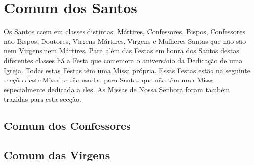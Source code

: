 \section{Comum dos Santos}

Os Santos caem em classes distintas: Mártires, Confessores, Bispos, Confessores não Bispos, Doutores, Virgens Mártires, Virgens e Mulheres Santas que não são nem Virgens nem Mártires. Para além das Festas em honra dos Santos destas diferentes classes há a Festa que comemora o aniversário da Dedicação de uma Igreja. Todas estas Festas têm uma Missa própria. Essas Festas estão na seguinte secção deste Missal e são usadas para Santos que não têm uma Missa especialmente dedicada a eles. As Missas de Nossa Senhora foram também trazidas para esta secção.


















\subsection{Comum dos Confessores}









\subsection{Comum das Virgens}







